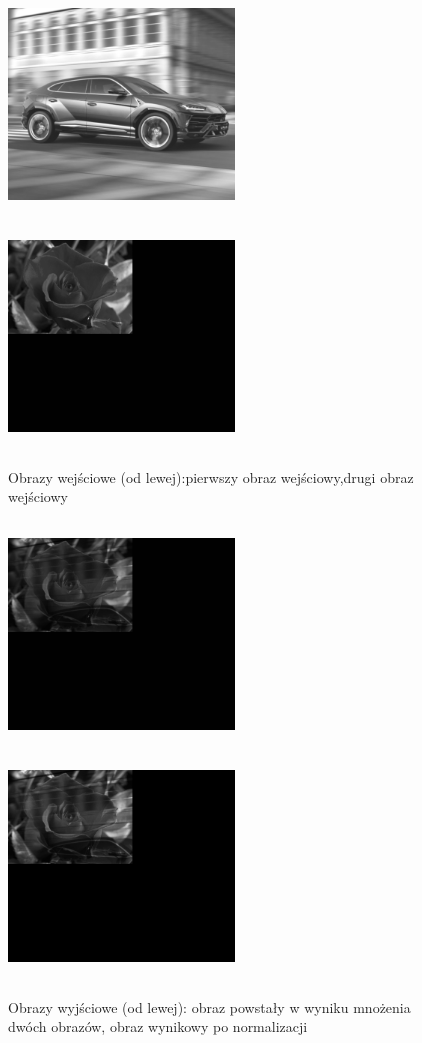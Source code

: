 \documentclass[magisterska,openany]{pracadypl}
\begin{document}
\newpage
\begin{figure}[h]
\centering
\includegraphics[width=6cm, height=6cm]{2_2/ResolG3.jpg}
\includegraphics[width=6cm, height=6cm]{2_2/ResolG4.jpg}
\caption{Obrazy wejściowe (od lewej):pierwszy obraz wejściowy,drugi obraz wejściowy}
\end{figure}
\begin{figure}[h]
\centering
\includegraphics[width=6cm, height=6cm]{3_4/multi_twoG2.jpg}
\includegraphics[width=6cm, height=6cm]{3_4/nmulti_twoG2.jpg}
\caption{Obrazy wyjściowe (od lewej): obraz powstały w wyniku mnożenia dwóch obrazów, obraz wynikowy po normalizacji}
\end{figure}
\end{document}
